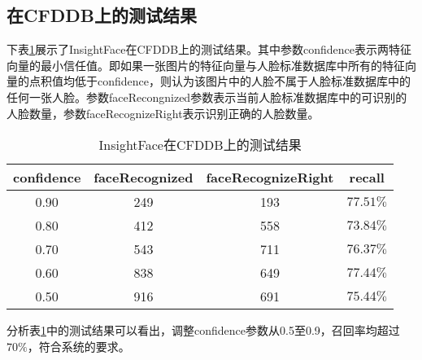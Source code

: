 \subsection{在CFDDB上的测试结果}

下表\ref{tab:arcface}展示了InsightFace在CFDDB上的测试结果。其中参数confidence表示两特征向量的最小信任值。即如果一张图片的特征向量与人脸标准数据库中所有的特征向量的点积值均低于confidence，则认为该图片中的人脸不属于人脸标准数据库中的任何一张人脸。参数faceRecongnized参数表示当前人脸标准数据库中的可识别的人脸数量，参数faceRecognizeRight表示识别正确的人脸数量。

\begin{table}[!hpb]
	\centering
	\caption{InsightFace在CFDDB上的测试结果}
	\label{tab:arcface}
	\begin{tabular}{ ccc | c }
		\hline
		confidence & faceRecognized & faceRecognizeRight &  recall\\
		\hline
		0.90 & 249 & 193 & $77.51\%$\\
		0.80 & 412 & 558 & $73.84\%$\\
		0.70 & 543 & 711 & $76.37\%$\\
		0.60 & 838 & 649 & $77.44\%$\\
		0.50 & 916 & 691 & $75.44\%$\\
		\hline
	\end{tabular}
\end{table}

分析表\ref{tab:arcface}中的测试结果可以看出，调整confidence参数从0.5至0.9，召回率均超过$70\%$，符合系统的要求。


